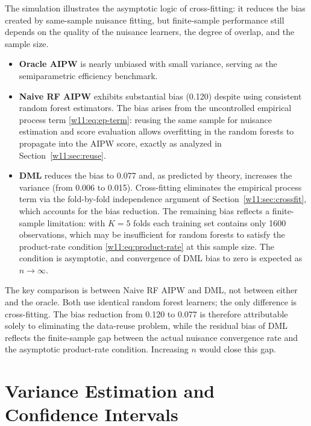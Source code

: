 \documentclass[master.tex]{subfiles}
\begin{document}
The simulation illustrates the asymptotic logic of cross-fitting:
it reduces the bias created by same-sample nuisance fitting, but
finite-sample performance still depends on the quality of the
nuisance learners, the degree of overlap, and the sample size.

\begin{itemize}
  \item \textbf{Oracle AIPW} is nearly unbiased with small variance,
    serving as the semiparametric efficiency benchmark.
  \item \textbf{Naive RF AIPW} exhibits substantial bias (0.120)
    despite using consistent random forest estimators.  The bias
    arises from the uncontrolled empirical process term
    \eqref{w11:eq:ep-term}: reusing the same sample for nuisance
    estimation and score evaluation allows overfitting in the
    random forests to propagate into the AIPW score, exactly as
    analyzed in Section~\ref{w11:sec:reuse}.
  \item \textbf{DML} reduces the bias to 0.077 and, as predicted by
    theory, increases the variance (from 0.006 to 0.015).
    Cross-fitting eliminates the empirical process term via the
    fold-by-fold independence argument of
    Section~\ref{w11:sec:crossfit}, which accounts for the
    bias reduction.  The remaining bias reflects a finite-sample
    limitation: with $K = 5$ folds each training set contains only
    1600 observations, which may be insufficient for random forests
    to satisfy the product-rate condition
    \eqref{w11:eq:product-rate} at this sample size.  The condition
    is asymptotic, and convergence of DML bias to zero is expected
    as $n \to \infty$.
\end{itemize}

\begin{remark}
  The key comparison is between Naive RF AIPW and DML, not between
  either and the oracle.  Both use identical random forest learners;
  the only difference is cross-fitting.  The bias reduction from
  0.120 to 0.077 is therefore attributable solely to eliminating
  the data-reuse problem, while the residual bias of DML reflects
  the finite-sample gap between the actual nuisance convergence rate
  and the asymptotic product-rate condition.  Increasing $n$
  would close this gap.
\end{remark}

\section{Variance Estimation and Confidence Intervals}
\label{w11:sec:variance}
\end{document}
